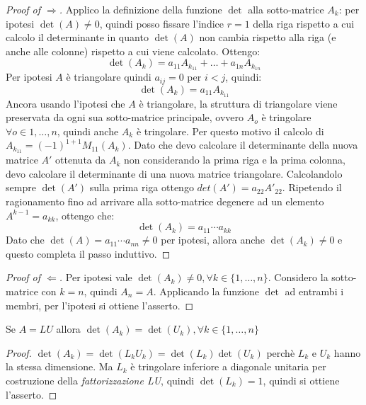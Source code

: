 \begin{proof}[Proof of $\Rightarrow$]
Applico la definizione della funzione $\det$ alla sotto-matrice $A_{k}$: per
ipotesi $\det(A) \not = 0$, quindi posso fissare l'indice $r = 1$ della riga
rispetto a cui calcolo il determinante in quanto $\det(A)$ non cambia rispetto
alla riga (e anche alle colonne) rispetto a cui viene calcolato. Ottengo:
\begin{displaymath}
\det(A_{k}) = a_{11}A_{k_{11}} + \ldots + a_{1n}A_{k_{1n}}
\end{displaymath}
Per ipotesi $A$ \`e triangolare quindi $a_{ij} = 0$ per $i < j$, quindi:
\begin{displaymath}
\det(A_{k}) = a_{11}A_{k_{11}}
\end{displaymath}
Ancora usando l'ipotesi che $A$ \`e triangolare, la struttura di triangolare
viene preservata da ogni sua sotto-matrice principale, ovvero $A_{o}$ \`e
tringolare $\forall o \in {1,\ldots,n}$, quindi anche $A_{k}$ \`e tringolare.
Per questo motivo il calcolo di $A_{k_{11}} = (-1)^{1+1}M_{11}(A_{k})$. Dato che
devo calcolare il determinante della nuova matrice $A'$ ottenuta da $A_{k}$ non
considerando la prima riga e la prima colonna, devo calcolare il determinante di
una nuova matrice triangolare. Calcolandolo sempre $\det(A')$ sulla prima riga
ottengo $det(A') = a_{22}A'_{22}$. Ripetendo il ragionamento fino ad arrivare
alla sotto-matrice degenere ad un elemento $A^{k-1} = a_{kk}$, ottengo che: 
\begin{displaymath}
\det(A_{k}) = a_{11}\cdots a_{kk}
\end{displaymath}
Dato che $\det(A) = a_{11} \cdots a_{nn} \not = 0$ per
ipotesi, allora anche $\det(A_{k}) \not = 0$ e questo completa il passo induttivo.
\end{proof}

\begin{proof}[Proof of $\Leftarrow$]
Per ipotesi vale $\det(A_{k}) \not = 0, \forall k \in \lbrace 1, \ldots,
n\rbrace$. Considero la sotto-matrice con $k = n$, quindi $A_{n} = A$.
Applicando la funzione $\det$ ad entrambi i membri, per l'ipotesi si
ottiene l'asserto.
\end{proof}



\begin{exercise}[3.5, Lemma 3.3]
Se $A = LU$ allora 
$\det(A_{k}) = \det(U_{k}), \forall k \in \lbrace 1,\ldots,n \rbrace$
\end{exercise}
\begin{proof}
$\det(A_{k}) = \det(L_{k}U_{k}) = \det(L_{k}) \det(U_{k})$ perch\`e $L_{k}$ e
$U_{k}$ hanno la stessa dimensione. Ma $L_{k}$ \`e tringolare inferiore a
diagonale unitaria per costruzione della \emph{fattorizzazione LU}, quindi
$\det(L_{k}) = 1$, quindi si ottiene l'asserto.
\end{proof}